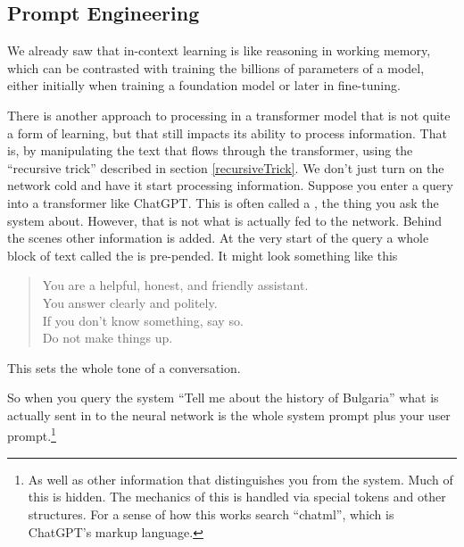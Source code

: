 \subsection{Prompt Engineering} 

We already saw that in-context learning is like reasoning in working memory,
which can be contrasted with training the billions of parameters of a model,
either initially when training a foundation model or later in fine-tuning.

There is another approach to processing in a transformer model that is not
quite a form of learning, but that still impacts its ability to process
information.  That is, by manipulating the text that flows through the
transformer, using the ``recursive trick'' described in section
\ref{recursiveTrick}.  We don't just turn on the network cold and have it start
processing information.  Suppose you enter a  query into a transformer like
ChatGPT. This is  often called a , the thing you ask the
system about. However, that is not what is actually fed to the network. Behind
the scenes other information is added.  At the very start of the query a whole
block of text called the  is pre-pended. It might look
something like this

\begin{quote}
You are a helpful, honest, and friendly assistant.\\
You answer clearly and politely.\\
If you don't know something, say so.\\
Do not make things up.
\end{quote}

This sets the whole tone of a conversation. 

So when you query the system ``Tell me about the history of Bulgaria'' what is
actually sent in to the neural network is the whole system prompt plus your
user prompt.\footnote{As well as other information that distinguishes you from
the system. Much of this is hidden. The mechanics of this is handled via
special tokens and other structures. For a sense of how this works search
``chatml'', which is ChatGPT's markup language.}

